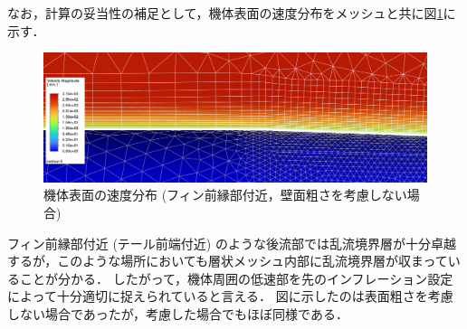 \documentclass[uplatex,dvipdfmx,a4j,12pt]{jsarticle}
\begin{document}
なお，計算の妥当性の補足として，機体表面の速度分布をメッシュと共に図\ref{fig:velocity}に示す．
\begin{figure}[H]
  \centering
  \includegraphics[width=\linewidth]{wall_function/img/4_1_velocity.png}
  \caption{機体表面の速度分布 (フィン前縁部付近，壁面粗さを考慮しない場合)}
  \label{fig:velocity}
\end{figure}
フィン前縁部付近 (テール前端付近) のような後流部では乱流境界層が十分卓越するが，このような場所においても層状メッシュ内部に乱流境界層が収まっていることが分かる．
したがって，機体周囲の低速部を先のインフレーション設定によって十分適切に捉えられていると言える．
図に示したのは表面粗さを考慮しない場合であったが，考慮した場合でもほぼ同様である．
\end{document}
